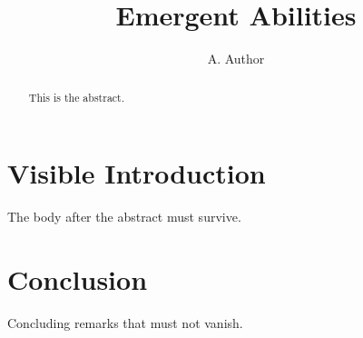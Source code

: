 \documentclass{article}
\title{Emergent Abilities}
\author{A. Author}
\newcommand{\hide}[1]{}
\begin{document}
\maketitle
\begin{abstract}
This is the abstract.
\end{abstract}
\hide{
\section{Hidden Introduction}
Hidden paragraph one.

Hidden paragraph two, after a blank line, inside the hidden block.
}
\section{Visible Introduction}
The body after the abstract must survive.
\section{Conclusion}
Concluding remarks that must not vanish.
\end{document}
